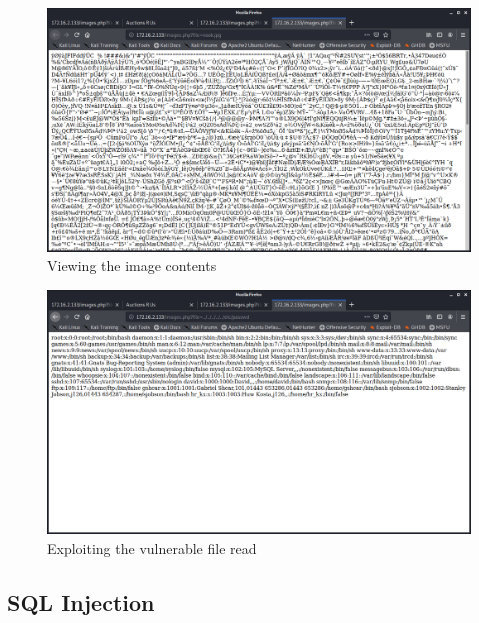 \documentclass{report}
\begin{document}
\begin{figure}[!htb]
	\centering
	\includegraphics[scale=0.4]{img/pathtraversal2.png}
	\caption{Viewing the image contents}
\end{figure}
\begin{figure}[!htb]
	\centering
	\includegraphics[scale=0.4]{img/pathtraversal3.png}
	\caption{Exploiting the vulnerable file read}
\end{figure}
\pagebreak



\subsection{SQL Injection}
\end{document}
